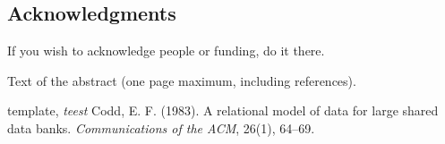 \documentclass[a4paper, 10pt]{article}
\begin{document}
\begin{CJK}{UTF8}{gbsn}
	\section*{Acknowledgments}
	If you wish to acknowledge people or funding, do it there.
	
	\printbibliography
Text of the abstract (one page maximum, including references).

\begin{thebibliography}{60}
	template,
	\textit{teest}
	 Codd, E. F. (1983). A relational model of data for large shared data banks. \textit{Communications of the ACM}, 26(1), 64--69.
	
\end{thebibliography}
	
\end{CJK}
\end{document}
